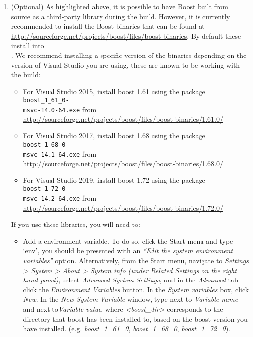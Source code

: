 \begin{enumerate}
  \item (Optional) As highlighted above, it is possible to have Boost built
  from source as a third-party library during the \nekpp build. However, it
  is currently recommended to install the Boost binaries that can be found at
  \url{http://sourceforge.net/projects/boost/files/boost-binaries}. By
  default these install into \\ . We recommend installing a specific version of the
    binaries depending on the version of Visual Studio you are using,
    these are known to be working with the \nekpp build:
  \begin{itemize}
  	\item For Visual Studio 2015, install boost 1.61 using the package
	 \texttt{boost\_1\_61\_0-\\msvc-14.0-64.exe} from \url{http://sourceforge.net/projects/boost/files/boost-binaries/1.61.0/}
  	\item For Visual Studio 2017, install boost 1.68 using the package
	 \texttt{boost\_1\_68\_0-\\msvc-14.1-64.exe} from \url{http://sourceforge.net/projects/boost/files/boost-binaries/1.68.0/}
  	\item For Visual Studio 2019, install boost 1.72 using the package
	 \texttt{boost\_1\_72\_0-\\msvc-14.2-64.exe}  from \url{http://sourceforge.net/projects/boost/files/boost-binaries/1.72.0/}
  \end{itemize}
  If you use these libraries, you will need to:
  \begin{itemize}
  	\item Add a  environment variable. To do so, click the
	Start menu and type `env', you should be presented with an \emph{``Edit
  the system environment variables''} option. Alternatively, from the Start
  menu, navigate to \emph{Settings > System > About > System info
	(under Related Settings on the right hand panel)}, select
	\emph{Advanced System Settings}, and in the \emph{Advanced} tab click the
	\emph{Environment Variables} button. In the \emph{System variables} box,
  click \emph{New}. In the \emph{New System Variable} window, type
   next to \emph{Variable name} and
   next to\emph{Variable value}, where \emph{<boost\_dir>}
  corresponds to the directory that boost has been installed to, based on the
  boost version you have installed. (e.g. \emph{boost\_1\_61\_0},
  \emph{boost\_1\_68\_0}, \emph{boost\_1\_72\_0}).


\end{itemize}
\end{enumerate}
